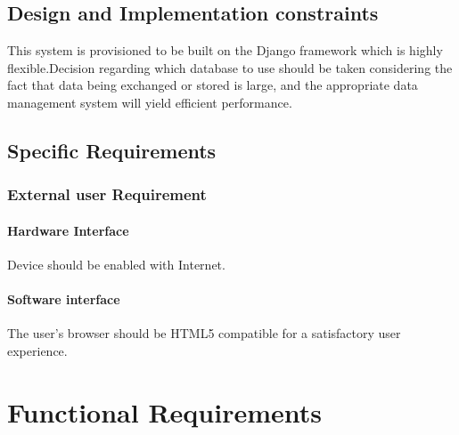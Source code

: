 \documentclass[letterpaper,10pt,english]{sphinxmanual}
\begin{document}
\section{Design and Implementation constraints}
\label{prodpersp:design-and-implementation-constraints}
This system is provisioned to be built on the Django framework which is highly flexible.Decision regarding which database to use should be taken considering the fact that data being exchanged or stored is large, and the appropriate data management system will yield efficient performance.


\section{Specific Requirements}
\label{prodpersp:specific-requirements}

\subsection{External user Requirement}
\label{prodpersp:external-user-requirement}

\subsubsection{Hardware Interface}
\label{prodpersp:hardware-interface}
Device should be enabled with Internet.


\subsubsection{Software interface}
\label{prodpersp:software-interface}
The user's browser should be HTML5 compatible for a satisfactory user experience.


\chapter{Functional Requirements}
\label{functionalreq::doc}\label{functionalreq:functional-requirements}
\end{document}
